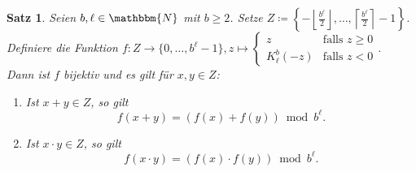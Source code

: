 \documentclass{article}
\newcommand{\N}{\mathbbm{N}} %
\newtheorem{satz}{Satz}
\begin{document}
  \begin{satz} \label{satz:Rechnen-Komplementdarstellung}
    Seien $b,\ell \in \N$ mit $b \geq 2$. Setze $Z \coloneq \left\{ - \left\lfloor \displaystyle\frac{b^\ell}{2} \right\rfloor , \dots, \left\lceil \displaystyle\frac{b^\ell}{2} \right\rceil -1 \right\}$.\\
    Definiere die Funktion $f \colon Z \to \{0, \dots, b^\ell-1\}, z \mapsto 
      \begin{cases}
        z &\text{falls } z \geq 0 \\
        K_\ell^b(-z) &\text{falls } z <0
      \end{cases}$.\\
    Dann ist $f$ bijektiv und es gilt für $x,y\in Z$:
    \begin{enumerate}[label=(\roman*)] 
      \item Ist $x+y \in Z$, so gilt 
        \[f(x+y) = (f(x) + f(y)) \bmod b^\ell.\] \label{satz:Rechnen-Komplementdarstellung_Addition}
      \item Ist $x \cdot y \in Z$, so gilt 
        \[f(x \cdot y) = (f(x) \cdot f(y)) \bmod b^\ell.\] \label{satz:Rechnen-Komplementdarstellung_Multiplikation}
    \end{enumerate}
  \end{satz}
\end{document}
